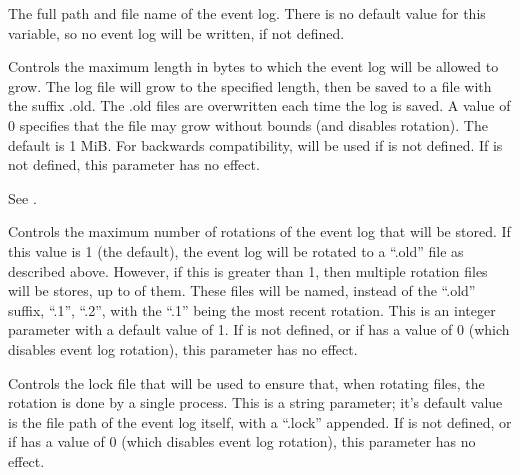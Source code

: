 \begin{description}

\label{param:EventLog}
\item[\Macro{EVENT\_LOG}]
  The full path and file name of the event log.
  There is no default value for this variable,
  so no event log will be written, if not defined.

\label{param:EventLogMaxSize}
\item[\Macro{EVENT\_LOG\_MAX\_SIZE}]
  Controls the maximum length in bytes to which the event log
  will be allowed to grow. The log file will grow to the specified length,
  then be saved to a file with the suffix .old.
  The .old  files are overwritten each time the log is saved.
  A value of 0 specifies that the file may grow without bounds (and
  disables rotation).   The default is 1 MiB.
  For backwards compatibility,  will be used if
   is not defined.
  If  is not defined, this parameter has no effect.

\label{param:MaxEventLog}
\item[\Macro{MAX\_EVENT\_LOG}]
  See .

\label{param:EventLogMaxRotations}
\item[\Macro{EVENT\_LOG\_MAX\_ROTATIONS}]
  Controls the maximum number of rotations of the event log that
  will be stored.  If this value is 1 (the default), the event log
  will be rotated to a ``.old'' file as described above.  However, if
  this is greater than 1, then multiple rotation files will be stores,
  up to  of them.  These files
  will be named, instead of the ``.old'' suffix, ``.1'', ``.2'', with
  the ``.1'' being the most recent rotation.  This is an integer
  parameter with a default value of 1.
  If  is not defined, or if
   has a value of 0 (which disables
  event log rotation), this parameter has no effect.

\label{param:EventLogRotationLock}
\item[\Macro{EVENT\_LOG\_ROTATION\_LOCK}]
  Controls the lock file that will be used to ensure that, when
  rotating files, the rotation is done by a single process.  This is a
  string parameter; it's default value is the file path of the
  event log itself, with a ``.lock'' appended.
  If  is not defined, or if
   has a value of 0 (which disables
  event log rotation), this parameter has no effect.


\end{description}
